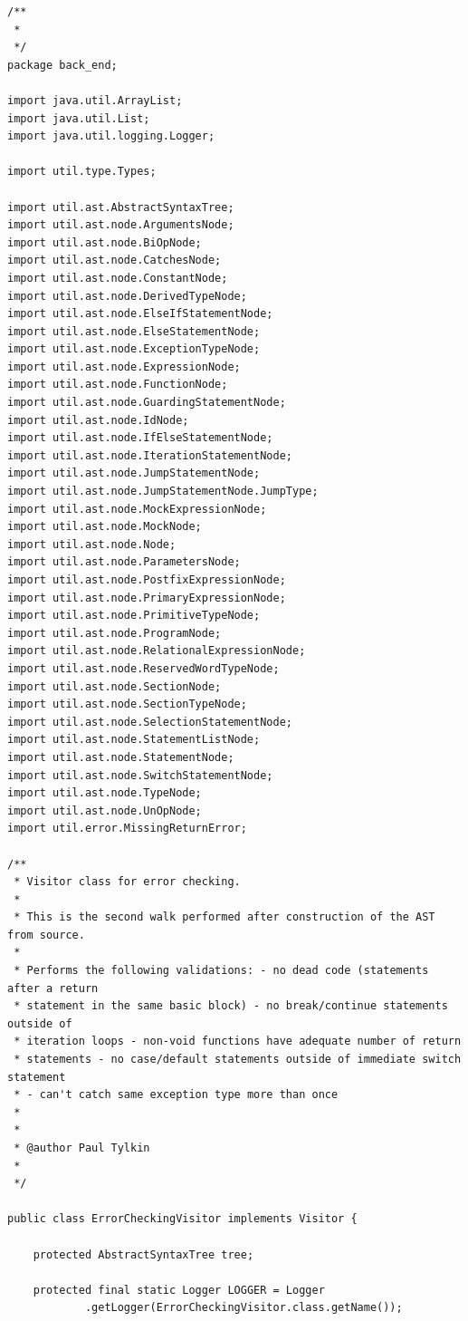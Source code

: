 \documentclass{book}
\begin{document}
\begin{verbatim}
/**
 * 
 */
package back_end;

import java.util.ArrayList;
import java.util.List;
import java.util.logging.Logger;

import util.type.Types;

import util.ast.AbstractSyntaxTree;
import util.ast.node.ArgumentsNode;
import util.ast.node.BiOpNode;
import util.ast.node.CatchesNode;
import util.ast.node.ConstantNode;
import util.ast.node.DerivedTypeNode;
import util.ast.node.ElseIfStatementNode;
import util.ast.node.ElseStatementNode;
import util.ast.node.ExceptionTypeNode;
import util.ast.node.ExpressionNode;
import util.ast.node.FunctionNode;
import util.ast.node.GuardingStatementNode;
import util.ast.node.IdNode;
import util.ast.node.IfElseStatementNode;
import util.ast.node.IterationStatementNode;
import util.ast.node.JumpStatementNode;
import util.ast.node.JumpStatementNode.JumpType;
import util.ast.node.MockExpressionNode;
import util.ast.node.MockNode;
import util.ast.node.Node;
import util.ast.node.ParametersNode;
import util.ast.node.PostfixExpressionNode;
import util.ast.node.PrimaryExpressionNode;
import util.ast.node.PrimitiveTypeNode;
import util.ast.node.ProgramNode;
import util.ast.node.RelationalExpressionNode;
import util.ast.node.ReservedWordTypeNode;
import util.ast.node.SectionNode;
import util.ast.node.SectionTypeNode;
import util.ast.node.SelectionStatementNode;
import util.ast.node.StatementListNode;
import util.ast.node.StatementNode;
import util.ast.node.SwitchStatementNode;
import util.ast.node.TypeNode;
import util.ast.node.UnOpNode;
import util.error.MissingReturnError;

/**
 * Visitor class for error checking.
 * 
 * This is the second walk performed after construction of the AST from source.
 * 
 * Performs the following validations: - no dead code (statements after a return
 * statement in the same basic block) - no break/continue statements outside of
 * iteration loops - non-void functions have adequate number of return
 * statements - no case/default statements outside of immediate switch statement
 * - can't catch same exception type more than once
 * 
 * 
 * @author Paul Tylkin
 * 
 */

public class ErrorCheckingVisitor implements Visitor {

	protected AbstractSyntaxTree tree;

	protected final static Logger LOGGER = Logger
			.getLogger(ErrorCheckingVisitor.class.getName());


\end{verbatim}
\end{document}
